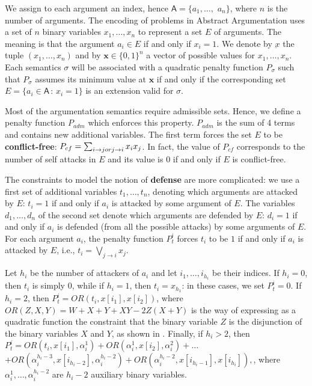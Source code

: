 \documentclass[conference]{IEEEtran}
\newcommand{\args}{\ensuremath{\mathsf{A}}\xspace} %
\newcommand{\atts}{\ensuremath{\rightarrow}\xspace}
\begin{document}
We assign to each argument an index, hence $\args=\{a_1,\dots,$ $a_n\}$, where $n$ is the number of arguments. The encoding of problems in Abstract Argumentation uses
a set of $n$ binary variables $x_1,\dots,x_n$ to represent a set $E$ of arguments.
The meaning is that the argument
$a_i\in E$ if and only if $x_i=1$. We denote by $\underbar{x}$ the tuple $(x_1,\dots,x_n)$
and by $\mathbf{x}\in\{0,1\}^n$ a vector of possible values for $x_1,\dots,x_n$.
Each semantics $\sigma$ will be associated with a quadratic penalty function $P_{\sigma}$ such that $P_{\sigma}$ assumes its minimum value at $\mathbf{x}$ if and only if the corresponding set $E=\{a_i\in \args \,:\, x_i=1\}$ is an extension valid for $\sigma$. 

Most of the argumentation semantics require admissible sets. Hence, we define a penalty function $P_{adm}$ which enforces this property. $P_{adm}$ is the sum of 4 terms and contains new additional variables.
The first term forces the set $E$ to be \textbf{conflict-free}:
$ P_{cf}=\sum_{i \atts j \mbox{ or }\\
	j \atts i} x_i x_j $. In fact, the value of $ P_{cf}$ corresponds to the number of self attacks in $E$
and its value is $0$ if and only if $E$ is conflict-free. 

The constraints to model the notion of \textbf{defense} are more complicated: we use a first set of additional variables $t_1,\dots,t_n$, denoting which arguments are attacked by $E$: $t_i=1$ if and only if $a_i$ is attacked by some argument of $E$. 
The variables $d_1,\dots,d_n$ of the second set denote which arguments are defended by $E$: $d_i=1$ if and only if $a_i$ is defended (from all the possible attacks) by some arguments of $E$. For each argument $a_i$, the penalty function $P_{t}^i$ forces $t_i$ to be $1$ if and only if $a_i$ is attacked by $E$, i.e.,
$t_i = \bigvee_{j \atts i} x_j$.

Let $h_i$ be the number of attackers of $a_i$ and let $i_1,\dots,i_{h_i}$ be
their indices. If $h_i=0$, then $t_i$ is simply $0$, while if $h_i=1$, then $t_i=x_{h_1}$:
in these cases, we set $P_{t}^i=0$.
If $h_i=2$, then $P_{t}^i=OR(t_i,x[i_1],x[i_2])$, where
$ OR(Z,X,Y)=W+X+Y+XY-2Z(X+Y)$
is the way of expressing as a quadratic function the constraint that the binary variable $Z$ is the disjunction of the binary variables $X$ and $Y$,
as shown in \cite{rosenberg}. Finally, if $h_i>2$, then
$ P_t^i=OR(t_i,x[i_1],\alpha_i^1)+OR(\alpha_i^1,x[i_2],\alpha_i^2)+\dots$
$ +OR(\alpha_i^{h_i-3},x[i_{h_i-2}],\alpha_i^{h_i-2})+
OR(\alpha_i^{h_i-2},x[i_{h_i-1}],x[i_{h_i}]), $, where $\alpha_i^1,\dots,\alpha_i^{h_i-2}$ are $h_i-2$ auxiliary binary variables.
\end{document}
